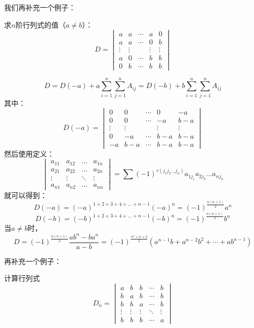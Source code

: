 我们再补充一个例子：
\begin{example}{}{}
    求$n$阶行列式的值（$a\neq b$）：\[D=\begin{vmatrix}
        a&a&\cdots&a&0\\
        a&a&\cdots&0&b\\
        \vdots&\vdots&&\vdots&\vdots\\
        a&0&\cdots&b&b\\
        0&b&\cdots&b&b\end{vmatrix}\]
\end{example}
\begin{solution}{}{}
    \[D=D(-a)+a\sum_{i=1}^n\sum_{j=1}^nA_{ij}=D(-b)+b\sum_{i=1}^n\sum_{j=1}^nA_{ij}\]
    其中：\[D(-a)=\begin{vmatrix}        
        0&0&\cdots&0&-a\\
        0&0&\cdots&-a&b-a\\
        \vdots&\vdots&&\vdots&\vdots\\
        0&-a&\cdots&b-a&b-a\\
        -a&b-a&\cdots&b-a&b-a\end{vmatrix}
    \]
    然后使用定义：
    \[\begin{vmatrix}a_{11}&a_{12}&\ldots&a_{1n}
        \\a_{21}&a_{22}&\ldots&a_{2n}\\
        \vdots&\vdots&\ddots&\vdots\\
        a_{n1}&a_{n2}&\ldots&a_{nn}\end{vmatrix}
        =\sum(-1)^{\tau(j_1j_2\ldots j_n)}a_{1j_1}a_{2j_2}\ldots a_{nj_n}\]
    就可以得到：\[D(-a)=(-a)^{1+2+3+4+...+n-1}(-a)^n=(-1)^{\frac{n(n+1)}{2}}a^n\]
    \[D(-b)=(-b)^{1+2+3+4+...+n-1}(-b)^n=(-1)^{\frac{n(n+1)}{2}}b^n\]
    当$a\neq b$时，\[D=(-1)^{\frac{n(n+1)}{2}}\frac{ab^n-ba^n}{a-b}=(-1)^{\frac{n^2+n+2}{2}}(a^{n-1}b+a^{n-2}b^2+\cdots+ab^{n-1})\]
\end{solution}
再补充一个例子：
\begin{example}{计算行列式}{}
    \[D_n=\begin{vmatrix}a&b&b&\cdots&b\\b&a&b&\cdots&b\\b&b&a&\cdots&b\\\vdots&\vdots&\vdots&\ddots&\vdots\\b&b&b&\cdots&a\end{vmatrix}\]
\end{example}
